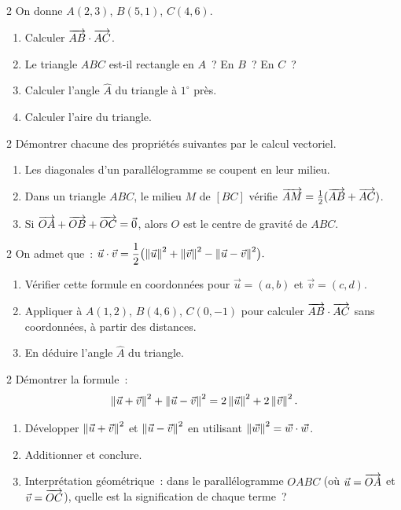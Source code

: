 \begin{exo}{2}
On donne $A(2,3)$, $B(5,1)$, $C(4,6)$.
\begin{enumerate}
  \item Calculer $\overrightarrow{AB}\cdot\overrightarrow{AC}$.
  \item Le triangle $ABC$ est-il rectangle en $A$~? En $B$~? En $C$~?
  \item Calculer l'angle $\hat{A}$ du triangle \`a $1^{\circ}$ pr\`es.
  \item Calculer l'aire du triangle.
\end{enumerate}
\end{exo}

\begin{exo}{2}
D\'emontrer chacune des propri\'et\'es suivantes par le calcul vectoriel.
\begin{enumerate}
  \item Les diagonales d'un parall\'elogramme se coupent en leur milieu.
  \item Dans un triangle $ABC$, le milieu $M$ de $[BC]$ v\'erifie
        $\overrightarrow{AM} = \frac{1}{2}(\overrightarrow{AB}+\overrightarrow{AC})$.
  \item Si $\overrightarrow{OA}+\overrightarrow{OB}+\overrightarrow{OC} = \vec{0}$, alors $O$ est le centre de gravité de $ABC$.
\end{enumerate}
\end{exo}

\begin{exo}{2}
On admet que~:
$\vec{u}\cdot\vec{v} = \dfrac{1}{2}\bigl(\left\|\vec{u}\right\|^2+\left\|\vec{v}\right\|^2
-\left\|\vec{u}-\vec{v}\right\|^2\bigr).$
\begin{enumerate}
  \item V\'erifier cette formule en coordonn\'ees pour $\vec{u}=(a,b)$
        et $\vec{v}=(c,d)$.
  \item Appliquer \`a $A(1,2)$, $B(4,6)$, $C(0,-1)$ pour calculer
        $\overrightarrow{AB}\cdot\overrightarrow{AC}$ sans coordonn\'ees, \`a partir des distances.
  \item En d\'eduire l'angle $\hat{A}$ du triangle.
\end{enumerate}
\end{exo}

\begin{exo}{2}
D\'emontrer la formule~:
$$\left\|\vec{u}+\vec{v}\right\|^2 + \left\|\vec{u}-\vec{v}\right\|^2
  = 2\left\|\vec{u}\right\|^2 + 2\left\|\vec{v}\right\|^2.$$
\begin{enumerate}
  \item D\'evelopper $\left\|\vec{u}+\vec{v}\right\|^2$ et $\left\|\vec{u}-\vec{v}\right\|^2$
        en utilisant $\left\|\vec{w}\right\|^2=\vec{w}\cdot\vec{w}$.
  \item Additionner et conclure.
  \item Interpr\'etation g\'eom\'etrique~: dans le parall\'elogramme $OABC$
        (o\`u $\vec{u}=\overrightarrow{OA}$ et $\vec{v}=\overrightarrow{OC}$), quelle est la signification
        de chaque terme~?
\end{enumerate}
\end{exo}

